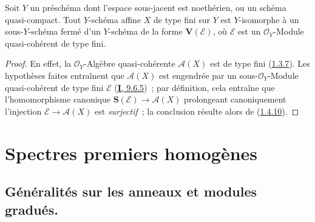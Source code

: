 \begin{proposition}[1.7.15]
\label{II.1.7.15-fr}
Soit $Y$ un préschéma dont l'espace sous-jacent est noethérien, ou un schéma
quasi-compact. Tout $Y$-schéma affine $X$ de type fini sur $Y$ est
$Y$-isomorphe à un sous-$Y$-schéma fermé d'un $Y$-schéma de la forme
$\mathbf{V}(\mathcal{E})$, où $\mathcal{E}$ est un $\mathcal{O}_Y$-Module
quasi-cohérent de type fini.
\end{proposition}

\begin{proof}
En effet, la $\mathcal{O}_Y$-Algèbre quasi-cohérente $\mathcal{A}(X)$ est de
type fini (\hyperref[II.1.3.7-fr]{1.3.7}). Les hypothèses faites entraînent
que $\mathcal{A}(X)$ est engendrée par un sous-$\mathcal{O}_Y$-Module
quasi-cohérent de type fini $\mathcal{E}$
(\hyperref[I.9.6.5-fr]{\textbf{I}, 9.6.5})~; par définition, cela entraîne que
l'homomorphisme canonique
$\mathbf{S}(\mathcal{E})\to\mathcal{A}(X)$ prolongeant canoniquement
l'injection $\mathcal{E}\to\mathcal{A}(X)$ est \emph{surjectif}~; la
conclusion résulte alors de (\hyperref[II.1.4.10-fr]{1.4.10}).
\end{proof}

\section{Spectres premiers homogènes}
\label{section:II.2-fr}

\subsection{Généralités sur les anneaux et modules gradués.}
\label{subsection:II.2.1-fr}

